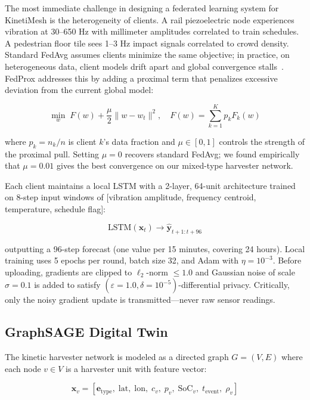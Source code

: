 \documentclass[conference]{IEEEtran}
\begin{document}
The most immediate challenge in designing a federated learning system for KinetiMesh is the heterogeneity of clients. A rail piezoelectric node experiences vibration at 30--650 Hz with millimeter amplitudes correlated to train schedules. A pedestrian floor tile sees 1--3 Hz impact signals correlated to crowd density. Standard FedAvg assumes clients minimize the same objective; in practice, on heterogeneous data, client models drift apart and global convergence stalls~\cite{fedprox2020}. FedProx addresses this by adding a proximal term that penalizes excessive deviation from the current global model:

\begin{equation}
\min_{w} \; F(w) + \frac{\mu}{2}\|w - w_t\|^2, \quad F(w) = \sum_{k=1}^{K} p_k F_k(w)
\label{eq:fedprox}
\end{equation}

where $p_k = n_k/n$ is client $k$'s data fraction and $\mu \in [0,1]$ controls the strength of the proximal pull. Setting $\mu = 0$ recovers standard FedAvg; we found empirically that $\mu = 0.01$ gives the best convergence on our mixed-type harvester network.

Each client maintains a local LSTM with a 2-layer, 64-unit architecture trained on 8-step input windows of [vibration amplitude, frequency centroid, temperature, schedule flag]:

\begin{equation}
\text{LSTM}(\mathbf{x}_t) \rightarrow \hat{\mathbf{y}}_{t+1:t+96}
\label{eq:lstm}
\end{equation}

outputting a 96-step forecast (one value per 15 minutes, covering 24 hours). Local training uses 5 epochs per round, batch size 32, and Adam with $\eta = 10^{-3}$. Before uploading, gradients are clipped to $\ell_2$-norm $\leq 1.0$ and Gaussian noise of scale $\sigma = 0.1$ is added to satisfy $(\varepsilon=1.0, \delta=10^{-5})$-differential privacy. Critically, only the noisy gradient update is transmitted—never raw sensor readings.

\subsection{GraphSAGE Digital Twin}

The kinetic harvester network is modeled as a directed graph $G = (V, E)$ where each node $v \in V$ is a harvester unit with feature vector:

\begin{equation}
\mathbf{x}_v = \left[\mathbf{e}_{\text{type}}, \; \text{lat}, \; \text{lon}, \; c_v, \; p_v, \; \text{SoC}_v, \; t_{\text{event}}, \; \rho_v\right]
\label{eq:feats}
\end{equation}
\end{document}
